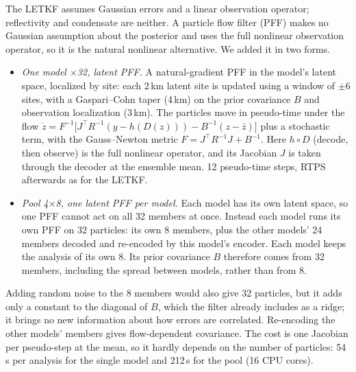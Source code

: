 \documentclass[11pt]{article}
\begin{document}
The LETKF assumes Gaussian errors and a linear observation operator; reflectivity and condensate are neither. A particle flow filter (PFF) makes no Gaussian assumption about the posterior and uses the full nonlinear observation operator, so it is the natural nonlinear alternative. We added it in two forms.
\begin{itemize}
\item \emph{One model $\times$32, latent PFF.} A natural-gradient PFF in the model's latent space, localized by site: each 2\,km latent site is updated using a window of $\pm 6$ sites, with a Gaspari--Cohn taper (4\,km) on the prior covariance $B$ and observation localization (3\,km). The particles move in pseudo-time under the flow $\dot z = F^{-1}\big[J^\top R^{-1}(y - h(D(z))) - B^{-1}(z - \bar z)\big]$ plus a stochastic term, with the Gauss--Newton metric $F = J^\top R^{-1} J + B^{-1}$. Here $h \circ D$ (decode, then observe) is the full nonlinear operator, and its Jacobian $J$ is taken through the decoder at the ensemble mean. 12 pseudo-time steps, RTPS afterwards as for the LETKF.
\item \emph{Pool 4$\times$8, one latent PFF per model.} Each model has its own latent space, so one PFF cannot act on all 32 members at once. Instead each model runs its own PFF on 32 particles: its own 8 members, plus the other models' 24 members decoded and re-encoded by this model's encoder. Each model keeps the analysis of its own 8. Its prior covariance $B$ therefore comes from 32 members, including the spread between models, rather than from 8.
\end{itemize}
Adding random noise to the 8 members would also give 32 particles, but it adds only a constant to the diagonal of $B$, which the filter already includes as a ridge; it brings no new information about how errors are correlated. Re-encoding the other models' members gives flow-dependent covariance. The cost is one Jacobian per pseudo-step at the mean, so it hardly depends on the number of particles: 54\,s per analysis for the single model and 212\,s for the pool (16 CPU cores).
\end{document}
